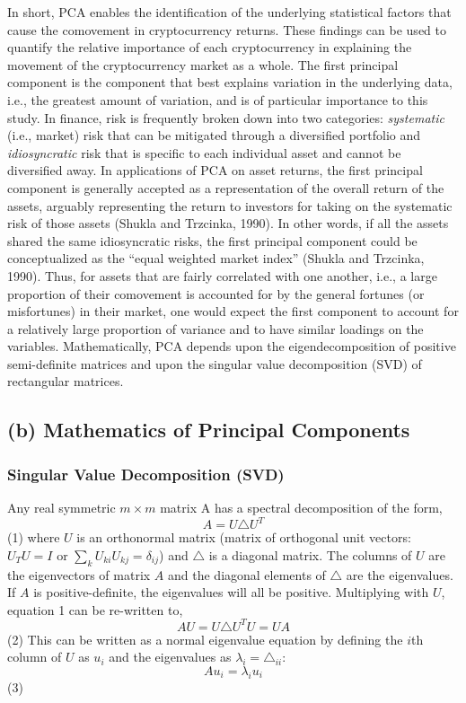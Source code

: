 \documentclass[12pt,twoside]{article}
\begin{document}
In short, PCA enables the identification of the underlying statistical factors that cause the comovement in cryptocurrency returns. These findings can be used to quantify the relative importance of each cryptocurrency in explaining the movement of the cryptocurrency market as a whole.
\bigbreak
The first principal component is the component that best explains variation in the underlying data, i.e., the greatest amount of variation, and is of particular importance to this study. In finance, risk is frequently broken down into two categories: \textit{systematic} (i.e., market) risk that can be mitigated through a diversified portfolio and \textit{idiosyncratic} risk that is specific to each individual asset and cannot be diversified away. In applications of PCA on asset returns, the first principal component is generally accepted as a representation of the overall return of the assets, arguably representing the return to investors for taking on the systematic risk of those assets (Shukla and Trzcinka, 1990). In other words, if all the assets shared the same idiosyncratic risks, the first principal component could be conceptualized as the “equal weighted market index” (Shukla and Trzcinka, 1990). Thus, for assets that are fairly correlated with one another, i.e., a large proportion of their comovement is accounted for by the general fortunes (or misfortunes) in their market, one would expect the first component to account for a relatively large proportion of variance and to have similar loadings on the variables.
\bigbreak
Mathematically, PCA depends upon the eigendecomposition of positive semi-definite matrices and upon the singular value decomposition (SVD) of rectangular matrices.

\subsection*{(b) Mathematics of Principal Components}

\subsubsection*{Singular Value Decomposition (SVD)}
\bigbreak
Any real symmetric $m \times m$ matrix A has a spectral decomposition of the form,
$$A = U\triangle U^{T}$$  \hfill(1)
\bigbreak
where $U$ is an orthonormal matrix (matrix of orthogonal unit vectors: $U_{T}U = I$ or $\sum_{k}U_{ki}U_{kj} = \delta_{ij}$) and $\triangle$ is a diagonal matrix. The columns of $U$ are the eigenvectors of matrix $A$ and the diagonal elements of $\triangle$ are the eigenvalues. If $A$ is positive-definite, the eigenvalues will all be positive. Multiplying with $U$, equation 1 can be re-written to,
$$AU = U\triangle U^{T}U = UA$$  \hfill(2)
\bigbreak
This can be written as a normal eigenvalue equation by defining the $i$th column of $U$ as
$u_{i}$ and the eigenvalues as $\lambda_{i} = \triangle_{ii}$:
$$Au_{i} = \lambda_{i}u_{i}$$  \hfill(3)
\end{document}

